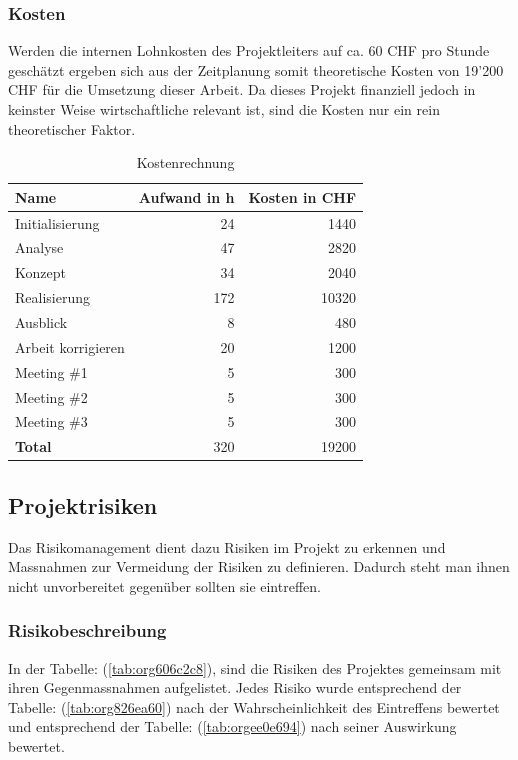 \subsubsection{Kosten}
\label{sec:org4c0ace3}

Werden die internen Lohnkosten des Projektleiters auf ca. 60 CHF pro Stunde
geschätzt ergeben sich aus der Zeitplanung somit theoretische Kosten von 19'200
CHF für die Umsetzung dieser Arbeit. Da dieses Projekt finanziell jedoch in
keinster Weise wirtschaftliche relevant ist, sind die Kosten nur ein rein
theoretischer Faktor.
\begin{table}[htbp]
\centering
\begin{tabular}{lrr}
\hline
\textbf{Name}\cellcolor[HTML]{C0C0C0} & \textbf{Aufwand in h}\cellcolor[HTML]{C0C0C0} & \textbf{Kosten in CHF}\cellcolor[HTML]{C0C0C0}\\
\hline
Initialisierung & 24 & 1440\\
Analyse & 47 & 2820\\
Konzept & 34 & 2040\\
Realisierung & 172 & 10320\\
Ausblick & 8 & 480\\
Arbeit korrigieren & 20 & 1200\\
Meeting \#1 & 5 & 300\\
Meeting \#2 & 5 & 300\\
Meeting \#3 & 5 & 300\\
\hline
\textbf{Total} & 320 & 19200\\
\hline
\end{tabular}
\caption{\label{tab:org6829dd7}
Kostenrechnung}

\end{table}

\subsection{Projektrisiken}
\label{sec:org51109de}

Das Risikomanagement dient dazu Risiken im Projekt zu erkennen und Massnahmen
zur Vermeidung der Risiken zu definieren. Dadurch steht man ihnen nicht
unvorbereitet gegenüber sollten sie eintreffen.

\subsubsection{Risikobeschreibung}
\label{sec:org3b92534}

In der Tabelle: (\ref{tab:org606c2c8}), sind die Risiken des Projektes
gemeinsam mit ihren Gegenmassnahmen aufgelistet. Jedes Risiko wurde
entsprechend der Tabelle: (\ref{tab:org826ea60}) nach der Wahrscheinlichkeit
des Eintreffens bewertet und entsprechend der Tabelle: (\ref{tab:orgee0e694}) nach
seiner Auswirkung bewertet.

